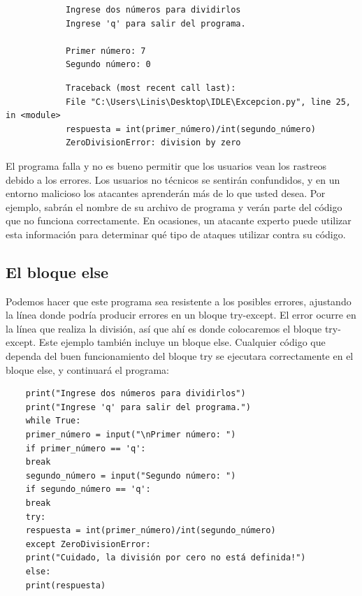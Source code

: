 {\ttfamily\scriptsize\scriptsize 
	\hspace{-0.65cm} \vspace{-0.3cm}	
	{\color{blue} 	
		\begin{verbatim}
			Ingrese dos números para dividirlos
			Ingrese 'q' para salir del programa.
			
			Primer número: 7
			Segundo número: 0
		\end{verbatim}
}}
{\ttfamily\scriptsize\scriptsize 
	\hspace{-0.65cm} \vspace{-0.3cm}	
	{\color{red} 	
		\begin{verbatim}
			Traceback (most recent call last):
			File "C:\Users\Linis\Desktop\IDLE\Excepcion.py", line 25, in <module>
			respuesta = int(primer_número)/int(segundo_número)
			ZeroDivisionError: division by zero		
		\end{verbatim}
}}

El programa falla y no es bueno permitir que los usuarios vean los rastreos debido a los errores. Los usuarios 
no técnicos se sentirán confundidos, y en un entorno malicioso los atacantes aprenderán más de lo que usted desea. Por ejemplo, sabrán el nombre de su archivo de programa y verán  parte del código que no funciona correctamente. En ocasiones, un atacante experto puede utilizar esta información para determinar qué tipo de ataques utilizar contra su código.


\subsection{El bloque else}

Podemos hacer que este programa sea resistente a los posibles errores, ajustando la línea donde podría producir errores en un bloque {\ttfamily try-except}. El error ocurre en la línea que realiza la división, así que ahí es donde colocaremos el bloque {\ttfamily try-except}. Este ejemplo también incluye un bloque {\ttfamily else}. Cualquier código que dependa del buen funcionamiento del bloque {\ttfamily try} se ejecutara  correctamente en el bloque {\ttfamily else}, y continuará el programa:


\hspace{-2.2cm}{\ttfamily \scriptsize calcula}

\vspace{-0.2cm}
\hspace{-2.0cm}{\ttfamily \scriptsize dora.py}\vspace{-0.84cm}
\begin{lstlisting}
	print("Ingrese dos números para dividirlos")
	print("Ingrese 'q' para salir del programa.")
	while True:
	primer_número = input("\nPrimer número: ")
	if primer_número == 'q':
	break
	segundo_número = input("Segundo número: ")
	if segundo_número == 'q':
	break
	try:
	respuesta = int(primer_número)/int(segundo_número)
	except ZeroDivisionError:
	print("Cuidado, la división por cero no está definida!")
	else:
	print(respuesta)
\end{lstlisting}

